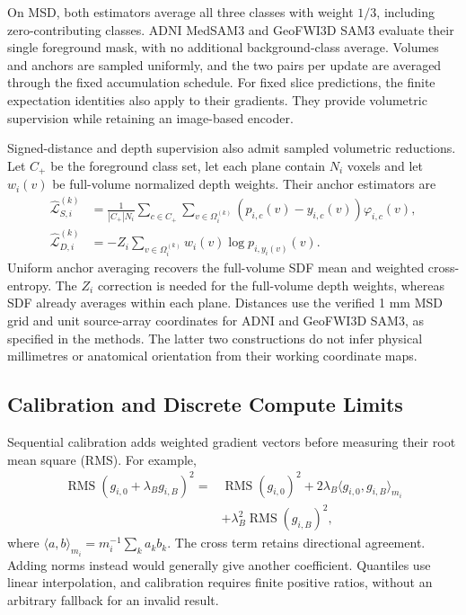 \documentclass[12pt,a4paper]{article}
\begin{document}
On MSD, both estimators average all three classes with weight $1/3$,
including zero-contributing classes. ADNI MedSAM3 and GeoFWI3D SAM3
evaluate their single foreground mask, with no additional
background-class average. Volumes and anchors are sampled
uniformly, and the two pairs per update are averaged through the
fixed accumulation schedule. For fixed slice predictions, the finite
expectation identities also apply to their gradients. They provide
volumetric supervision while retaining an image-based encoder.


Signed-distance and depth supervision also admit sampled volumetric
reductions. Let $C_+$ be the foreground class set, let each plane
contain $N_i$ voxels and let $w_i(v)$ be full-volume normalized depth
weights. Their anchor estimators are
\begin{align}
\widehat{\mathcal L}_{S,i}^{(k)}
 &=\frac{1}{|C_+|N_i}\sum_{c\in C_+}
   \sum_{v\in\Omega_i^{(k)}}(p_{i,c}(v)-y_{i,c}(v))\varphi_{i,c}(v),
   \label{eq:medsam-sampled-sdf}\\
\widehat{\mathcal L}_{D,i}^{(k)}
 &=-Z_i\sum_{v\in\Omega_i^{(k)}}w_i(v)\log p_{i,y_i(v)}(v).
   \label{eq:medsam-sampled-depth}
\end{align}
Uniform anchor averaging recovers the full-volume SDF mean and weighted
cross-entropy. The $Z_i$ correction is needed for the full-volume depth
weights, whereas SDF already averages within each plane. Distances use the
verified 1 mm MSD grid and unit source-array coordinates for ADNI and
GeoFWI3D SAM3, as specified in the methods. The latter two constructions
do not infer physical millimetres or anatomical orientation from their
working coordinate maps.

\subsection{Calibration and Discrete Compute Limits}

Sequential calibration adds weighted gradient vectors before measuring
their root mean square (RMS). For example,
\begin{equation}
\begin{aligned}
\operatorname{RMS}(g_{i,0}+\lambda_B g_{i,B})^2
={}&\operatorname{RMS}(g_{i,0})^2
 +2\lambda_B\langle g_{i,0},g_{i,B}\rangle_{m_i}\\
 &+\lambda_B^2\operatorname{RMS}(g_{i,B})^2,
\end{aligned}
\label{eq:calibration-cross-term}
\end{equation}
where $\langle a,b\rangle_{m_i}=m_i^{-1}\sum_k a_kb_k$.
The cross term retains directional agreement. Adding norms instead
would generally give another coefficient. Quantiles use linear
interpolation, and calibration requires finite positive ratios,
without an arbitrary fallback for an invalid result.
\end{document}
